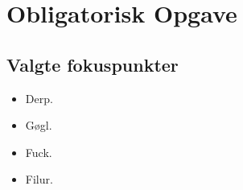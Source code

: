 \section{Obligatorisk Opgave}

\subsection{Valgte fokuspunkter}

\begin{itemize}
	\item Derp.
	\item Gøgl.
	\item Fuck.
	\item Filur.
\end{itemize}